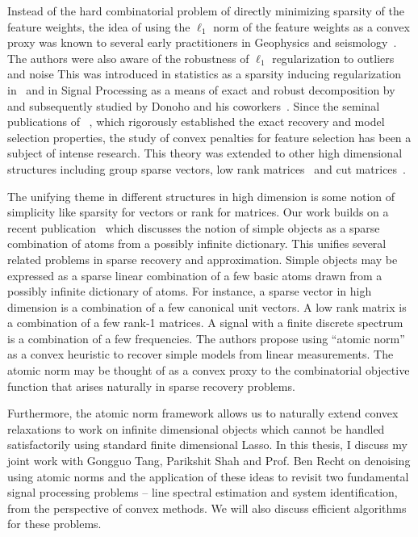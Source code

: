 Instead of the hard combinatorial problem of directly minimizing sparsity of the
feature weights, the idea of using the $\ell_1$ norm of the feature weights as a
convex proxy was known to several early practitioners in Geophysics and
seismology~\cite{claerbout:robust,taylor:deconvolution,levy:spike-train,santosa}.
The authors were also aware of the robustness of $\ell_1$ regularization to
outliers and noise This was introduced in statistics as a sparsity inducing
regularization in~\cite{tibshirani96} and in Signal Processing as a means of
exact and robust decomposition by~\cite{chen98} and subsequently studied by
Donoho and his coworkers~\cite{donoho:huo,spark}. Since the seminal publications
of ~\cite{CRT06,meinshausen:variable-selection}, which rigorously established
the exact recovery and model selection properties, the study of convex penalties
for feature selection has been a subject of intense research. This theory was
extended to other high dimensional structures including group sparse
vectors\cite{group:lasso}, low rank matrices~\cite{recht07} and cut
matrices~\cite{cut:goemans}.


The unifying theme in different structures in high dimension is some notion of
simplicity like sparsity for vectors or rank for matrices. Our work builds on a
recent publication~\cite{crpw} which discusses the notion of simple objects as a
sparse combination of atoms from a possibly infinite dictionary. This unifies
several related problems in sparse recovery and approximation. Simple objects
may be expressed as a sparse linear combination of a few basic atoms drawn from
a possibly infinite dictionary of atoms. For instance, a sparse vector in high
dimension is a combination of a few canonical unit vectors. A low rank matrix is
a combination of a few rank-1 matrices. A signal with a finite discrete spectrum
is a combination of a few frequencies. The authors propose using ``atomic norm''
as a convex heuristic to recover simple models from linear measurements. The
atomic norm may be thought of as a convex proxy to the combinatorial objective
function that arises naturally in sparse recovery problems.

Furthermore, the atomic norm framework allows us to naturally extend convex
relaxations to work on infinite dimensional objects which cannot be handled
satisfactorily using standard finite dimensional Lasso. In this thesis, I
discuss my joint work with Gongguo Tang, Parikshit Shah and Prof. Ben Recht on
denoising using atomic norms and the application of these ideas to revisit two
fundamental signal processing problems -- line spectral estimation and system
identification, from the perspective of convex methods. We will also discuss
efficient algorithms for these problems.

